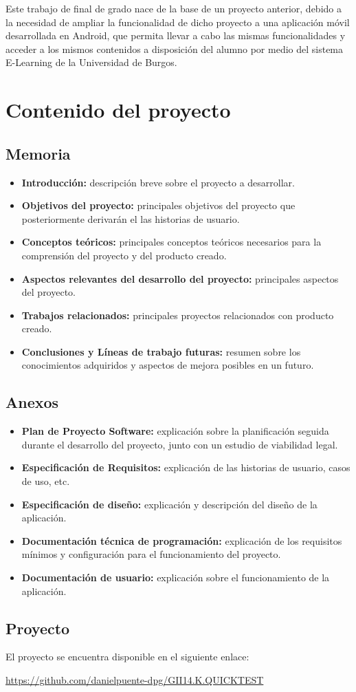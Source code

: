

Este trabajo de final de grado nace de la base de un proyecto anterior, debido a la necesidad de ampliar la funcionalidad de dicho proyecto a una aplicación móvil desarrollada en Android, que permita llevar a cabo las mismas funcionalidades y acceder a los mismos contenidos a disposición del alumno por medio del sistema E-Learning de la Universidad de Burgos.

\section{Contenido del proyecto}

\subsection{Memoria}
\begin{itemize}
	\item \textbf{Introducción:} descripción breve sobre el proyecto a desarrollar.
	\item \textbf{Objetivos del proyecto:} principales objetivos del proyecto que posteriormente derivarán el las historias de usuario.
	\item \textbf{Conceptos teóricos:} principales conceptos teóricos necesarios para la comprensión del proyecto y del producto creado.
	\item \textbf{Aspectos relevantes del desarrollo del proyecto:} principales aspectos del proyecto.
	\item \textbf{Trabajos relacionados:} principales proyectos relacionados con producto creado.
	\item \textbf{Conclusiones y Líneas de trabajo futuras:} resumen sobre los conocimientos adquiridos y aspectos de mejora posibles en un futuro.
	
\end{itemize}

\subsection{Anexos}

\begin{itemize}
	\item \textbf{Plan de Proyecto Software:} explicación sobre la planificación seguida durante el desarrollo del proyecto, junto con un estudio de viabilidad legal.
	\item \textbf{Especificación de Requisitos:} explicación de las historias de usuario, casos de uso, etc.
	\item \textbf{Especificación de diseño:} explicación y descripción del diseño de la aplicación.
	\item \textbf{Documentación técnica de programación:} explicación de los requisitos mínimos y configuración para el funcionamiento del proyecto.
	\item \textbf{Documentación de usuario:} explicación sobre el funcionamiento de la aplicación.
	
\end{itemize}

\subsection{Proyecto}

El proyecto se encuentra disponible en el siguiente enlace:

\url{https://github.com/danielpuente-dpg/GII14.K.QUICKTEST}

